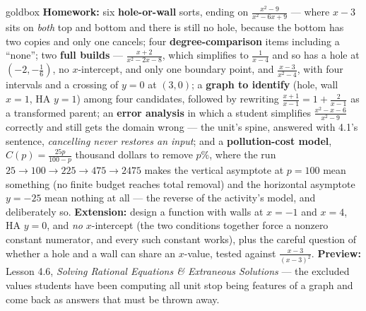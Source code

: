\documentclass[10pt]{article}
\begin{document}
\begin{skillbox}{goldbox}
\textbf{Homework:} six \textbf{hole-or-wall} sorts, ending on $\frac{x^2-9}{x^2-6x+9}$ --- where
$x-3$ sits on \emph{both} top and bottom and there is still no hole, because the bottom has two copies
and only one cancels; four \textbf{degree-comparison} items including a ``none''; two \textbf{full
builds} --- $\frac{x+2}{x^2-2x-8}$, which simplifies to $\frac{1}{x-4}$ and so has a hole at
$(-2,-\frac16)$, no $x$-intercept, and only one boundary point, and $\frac{x-3}{x^2-4}$, with four
intervals and a crossing of $y=0$ at $(3,0)$; a \textbf{graph to identify} (hole, wall $x=1$, HA
$y=1$) among four candidates, followed by rewriting $\frac{x+1}{x-1}=1+\frac{2}{x-1}$ as a transformed
parent; an \textbf{error analysis} in which a student simplifies $\frac{x^2-x-6}{x^2-9}$ correctly and
still gets the domain wrong --- the unit's spine, answered with 4.1's sentence, \emph{cancelling never
restores an input}; and a \textbf{pollution-cost model}, $C(p)=\frac{25p}{100-p}$ thousand dollars to
remove $p\%$, where the run $25\to100\to225\to475\to2475$ makes the vertical asymptote at $p=100$ mean
something (no finite budget reaches total removal) and the horizontal asymptote $y=-25$ mean nothing at
all --- the reverse of the activity's model, and deliberately so. \textbf{Extension:} design a function
with walls at $x=-1$ and $x=4$, HA $y=0$, and \emph{no} $x$-intercept (the two conditions together force
a nonzero constant numerator, and every such constant works), plus the careful question of whether a
hole and a wall can share an $x$-value, tested against $\frac{x-3}{(x-3)^2}$. \textbf{Preview:} Lesson
4.6, \emph{Solving Rational Equations \& Extraneous Solutions} --- the excluded values students have
been computing all unit stop being features of a graph and come back as answers that must be thrown
away.
\end{skillbox}
\end{document}
